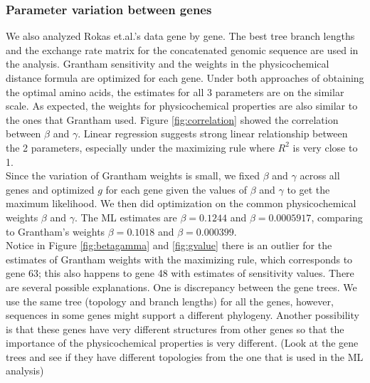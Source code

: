 \documentclass[13pt]{article}
\begin{document}
\subsubsection{Parameter variation between genes}
We also analyzed Rokas et.al.'s data gene by gene. The best tree branch lengths  and the exchange rate matrix for the concatenated genomic sequence are used in the analysis. Grantham sensitivity and the weights in the physicochemical distance formula are optimized for each gene. Under both approaches of obtaining the optimal amino acids, the estimates for all 3 parameters are on the similar scale. As expected, the weights for physicochemical properties are also similar to the ones that Grantham used. Figure \ref{fig:correlation} showed the correlation between $\beta$ and $\gamma$. Linear regression suggests strong linear relationship between the 2 parameters, especially under the maximizing rule where $R^2$ is very close to 1.\\

Since the variation of Grantham weights is small, we fixed $\beta$ and $\gamma$ across all genes and optimized $g$ for each gene given the values of $\beta$ and $\gamma$ to get the maximum likelihood. We then did optimization on the common physicochemical weights $\beta$ and $\gamma$. The ML estimates are $\beta = 0.1244$ and $\beta = 0.0005917$, comparing to Grantham's weights $\beta = 0.1018$ and $\beta = 0.000399$.\\

Notice in Figure \ref{fig:betagamma} and \ref{fig:gvalue}  there is an outlier for the estimates of Grantham weights with the maximizing rule, which corresponds to gene 63; this also happens to gene 48 with estimates of sensitivity values. There are several possible explanations. One is discrepancy between the gene trees. We use the same tree (topology and branch lengths) for all the genes, however, sequences in some genes might support a different phylogeny. Another possibility is that these genes have very different structures from other genes so that the importance of the physicochemical properties is very different. (Look at the gene trees and see if they have different topologies from the one that is used in the ML analysis)\\
\end{document}
